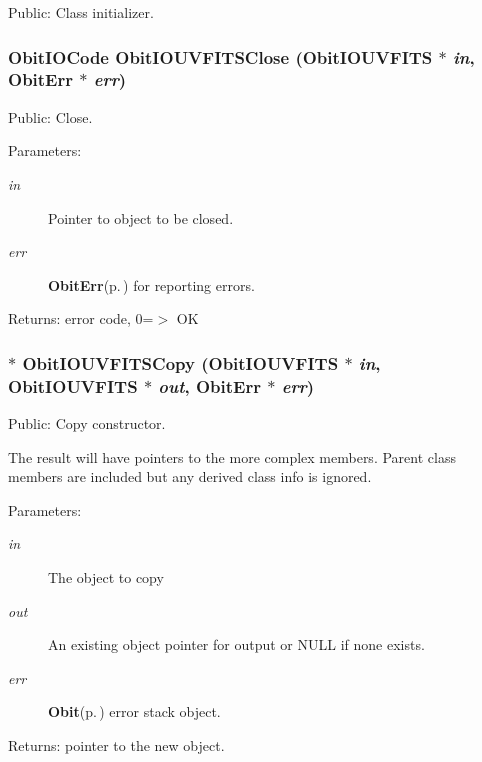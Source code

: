 Public: Class initializer. 

\subsubsection{\setlength{\rightskip}{0pt plus 5cm}Obit\-IOCode Obit\-IOUVFITSClose ({\bf Obit\-IOUVFITS} $\ast$ {\em in}, {\bf Obit\-Err} $\ast$ {\em err})}\label{ObitIOUVFITS_8h_a11}


Public: Close. 

\begin{Desc}
\item[Parameters:]
\begin{description}
\item[{\em in}]Pointer to object to be closed. \item[{\em err}]{\bf Obit\-Err}{\rm (p.\,\pageref{structObitErr})} for reporting errors. \end{description}
\end{Desc}
\begin{Desc}
\item[Returns:]error code, 0=$>$ OK \end{Desc}
\subsubsection{$\ast$ Obit\-IOUVFITSCopy ({\bf Obit\-IOUVFITS} $\ast$ {\em in}, {\bf Obit\-IOUVFITS} $\ast$ {\em out}, {\bf Obit\-Err} $\ast$ {\em err})}\label{ObitIOUVFITS_8h_a6}


Public: Copy constructor. 

The result will have pointers to the more complex members. Parent class members are included but any derived class info is ignored. \begin{Desc}
\item[Parameters:]
\begin{description}
\item[{\em in}]The object to copy \item[{\em out}]An existing object pointer for output or NULL if none exists. \item[{\em err}]{\bf Obit}{\rm (p.\,\pageref{structObit})} error stack object. \end{description}
\end{Desc}
\begin{Desc}
\item[Returns:]pointer to the new object. \end{Desc}
